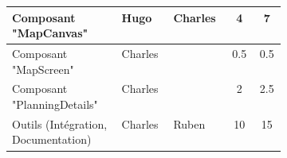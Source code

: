 \begin{longtable}{|p{0.4\linewidth}|l|l|c|c|}
Composant "MapCanvas"                & Hugo             & Charles     & 4                    & 7                   \\ \hline
Composant "MapScreen"                & Charles          &             & 0.5                  & 0.5                 \\ \hline
Composant "PlanningDetails"          & Charles          &             & 2                    & 2.5                 \\ \hline
Outils (Intégration, Documentation)  & Charles          & Ruben       & 10                   & 15                  \\ \hline
\end{longtable}
